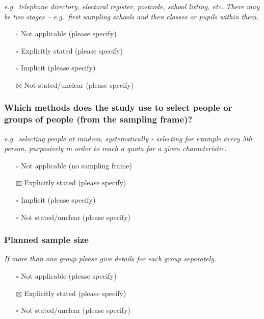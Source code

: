 \documentclass[
  doc, a4paper]{apa7}
\providecommand{\tightlist}{%
  \setlength{\itemsep}{0pt}\setlength{\parskip}{0pt}}
\begin{document}
\emph{e.g.~telephone directory, electoral register, postcode, school listing, etc. There may be two stages -- e.g.~first sampling schools and then classes or pupils within them.}

\begin{itemize}
\tightlist
\item[$\square$]
  Not applicable (please specify)
\item[$\square$]
  Explicitly stated (please specify)
\item[$\square$]
  Implicit (please specify)
\item[$\boxtimes$]
  Not stated/unclear (please specify)
\end{itemize}

\subsubsection{Which methods does the study use to select people or groups of people (from the sampling frame)?}\label{which-methods-does-the-study-use-to-select-people-or-groups-of-people-from-the-sampling-frame}

\emph{e.g.~selecting people at random, systematically - selecting for example every 5th person, purposively in order to reach a quota for a given characteristic.}

\begin{itemize}
\tightlist
\item[$\square$]
  Not applicable (no sampling frame)
\item[$\boxtimes$]
  Explicitly stated (please specify)
\item[$\square$]
  Implicit (please specify)
\item[$\square$]
  Not stated/unclear (please specify)
\end{itemize}

\subsubsection{Planned sample size}\label{planned-sample-size}

\emph{If more than one group please give details for each group separately.}

\begin{itemize}
\tightlist
\item[$\square$]
  Not applicable (please specify)
\item[$\boxtimes$]
  Explicitly stated (please specify)
\item[$\square$]
  Not stated/unclear (please specify)
\end{itemize}
\end{document}
